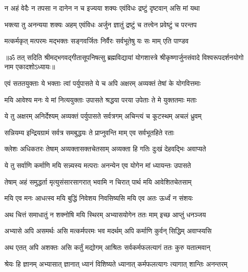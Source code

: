 \twolineshloka
{न अहं वेदैः न तपसा न दानेन न च इज्यया}
{शक्यः एवंविधः द्रष्टुं दृष्टवान् असि मां यथा}%

\twolineshloka
{भक्त्या तु अनन्यया शक्यः अहम् एवंविधः अर्जुन}
{ज्ञातुं द्रष्टुं च तत्त्वेन प्रवेष्टुं च परन्तप}%

\twolineshloka
{मत्कर्मकृत् मत्परमः मद्भक्तः सङ्गवर्जितः}
{निर्वैरः सर्वभूतेषु यः सः माम् एति पाण्डव}%

{॥ॐ तत् सदिति श्रीमद्भगवद्गीतासूपनिषत्सु ब्रह्मविद्यायां योगशास्त्रे श्रीकृष्णार्जुनसंवादे विश्वरूपदर्शनयोगो नाम एकादशोऽध्यायः॥}



\twolineshloka
{एवं सततयुक्ताः ये भक्ताः त्वां पर्युपासते}
{ये च अपि अक्षरम् अव्यक्तं तेषां के योगवित्तमाः}%


\twolineshloka
{मयि आवेश्य मनः ये मां नित्ययुक्ताः उपासते}
{श्रद्धया परया उपेताः ते मे युक्ततमाः मताः}%

\twolineshloka
{ये तु अक्षरम् अनिर्देश्यम् अव्यक्तं पर्युपासते}
{सर्वत्रगम् अचिन्त्यं च कूटस्थम् अचलं ध्रुवम्}%

\twolineshloka
{सन्नियम्य इन्द्रियग्रामं सर्वत्र समबुद्धयः}
{ते प्राप्नुवन्ति माम् एव सर्वभूतहिते रताः}%

\twolineshloka
{क्लेशः अधिकतरः तेषाम् अव्यक्तासक्तचेतसाम्}
{अव्यक्ता हि गतिः दुःखं देहवद्भिः अवाप्यते}%

\twolineshloka
{ये तु सर्वाणि कर्माणि मयि सन्न्यस्य मत्पराः}
{अनन्येन एव योगेन मां ध्यायन्तः उपासते}%

\twolineshloka
{तेषाम् अहं समुद्धर्ता मृत्युसंसारसागरात्}
{भवामि न चिरात् पार्थ मयि आवेशितचेतसाम्}%

\twolineshloka
{मयि एव मनः आधत्स्व मयि बुद्धिं निवेशय}
{निवसिष्यसि मयि एव अतः ऊर्ध्वं न संशयः}%

\twolineshloka
{अथ चित्तं समाधातुं न शक्नोषि मयि स्थिरम्}
{अभ्यासयोगेन ततः माम् इच्छ आप्तुं धनञ्जय}%

\twolineshloka
{अभ्यासे अपि असमर्थः असि मत्कर्मपरमः भव}
{मदर्थम् अपि कर्माणि कुर्वन् सिद्धिम् अवाप्स्यसि}%

\twolineshloka
{अथ एतत् अपि अशक्तः असि कर्तुं मद्योगम् आश्रितः}
{सर्वकर्मफलत्यागं ततः कुरु यतात्मवान्}%

\twolineshloka
{श्रेयः हि ज्ञानम् अभ्यासात् ज्ञानात् ध्यानं विशिष्यते}
{ध्यानात् कर्मफलत्यागः त्यागात् शान्तिः अनन्तरम्}%

